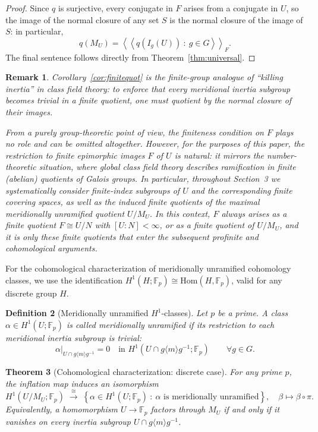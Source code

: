 \documentclass[11pt]{article}
\newtheorem{theorem}{Theorem}[section]
\newtheorem{definition}[theorem]{Definition}
\newtheorem{remark}[theorem]{Remark}
\begin{document}
	\begin{proof}
		Since $q$ is surjective, every conjugate in $F$ arises from a conjugate in $U$, so the image of the normal closure of any set $S$ is the normal closure of the image of $S$: in particular,
		\[ q(M_U)= \left\langle\!\left\langle q(I_g(U))\ :\ g\in G\right\rangle\!\right\rangle_F.\]
		The final sentence follows directly from Theorem~\ref{thm:universal}.
	\end{proof}
	
	\begin{remark}
		Corollary~\ref{cor:finitequot} is the finite-group analogue of ``killing inertia'' in class field theory: to enforce that every meridional inertia subgroup becomes trivial in a finite quotient, one must quotient by the normal closure of their images.
		
		From a purely group-theoretic point of view, the finiteness condition on $F$ plays no role and can be omitted altogether. However, for the purposes of this paper, the restriction to finite epimorphic images $F$ of $U$ is natural: it mirrors the number-theoretic situation, where global class field theory describes ramification in \textit{finite} (abelian) quotients of Galois groups.
		In particular, throughout Section~3 we systematically consider finite-index subgroups of $U$ and the corresponding finite covering spaces, as well as the induced finite quotients of the maximal meridionally unramified quotient $U/M_U$. In this context, $F$ always arises as a finite quotient $F \cong U/N$ with $[U:N]<\infty$, or as a finite quotient of $U/M_U$, and it is only these finite quotients that enter the subsequent profinite and cohomological arguments.
	\end{remark}
	
	For the cohomological characterization of meridionally unramified cohomology classes, we use the identification $H^1(H;\mathbb F_p)\cong \mathrm{Hom}(H,\mathbb F_p)$, valid for any discrete group $H$.
	
	\begin{definition}[Meridionally unramified $H^1$-classes]
		Let $p$ be a prime. A class $\alpha\in H^1(U;\mathbb F_p)$ is called \emph{meridionally unramified} if its restriction to each meridional inertia subgroup is trivial:
		\[\alpha|_{U\cap g\langle m\rangle g^{-1}} = 0 \quad\text{in } H^1(U\cap g\langle m\rangle g^{-1};\mathbb F_p) \qquad\forall g\in G.\]
	\end{definition}
	
	\begin{theorem}[Cohomological characterization: discrete case]\label{thm:H1-discrete}
		For any prime $p$, the inflation map induces an isomorphism
		\begin{equation}\label{eq:infl}
			H^1(U/M_U;\mathbb F_p) \;\xrightarrow{\ \cong\ }\; \left\{\alpha\in H^1(U;\mathbb F_p)\ :\ \alpha\text{ is meridionally unramified}\right\}, \quad \beta\mapsto\beta\circ\pi.
		\end{equation}
		Equivalently, a homomorphism $U\to \mathbb F_p$ factors through $M_U$ if and only if it vanishes on every inertia subgroup $U\cap g\langle m\rangle g^{-1}$.
	\end{theorem}
	
\end{document}
